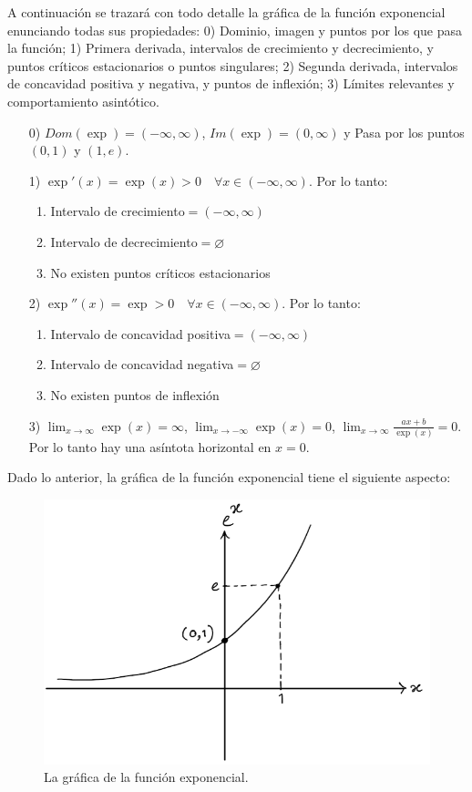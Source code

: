 \documentclass{article}
\numberwithin{equation}{section}
\begin{document}
A continuación se trazará con todo detalle la gráfica de la función exponencial enunciando todas sus propiedades: 0) Dominio, imagen y puntos por los que pasa la función; 1) Primera derivada, intervalos de crecimiento y decrecimiento, y puntos críticos estacionarios o puntos singulares; 2) Segunda derivada, intervalos de concavidad positiva y negativa, y puntos de inflexión; 3) Límites relevantes y comportamiento asintótico. 

\begin{enumerate}
    \item[0)] $Dom(\exp)=(-\infty,\infty)$, $Im(\exp)=(0,\infty)$ y Pasa por los puntos $(0,1)$ y $(1,e)$.
    \item[1)] $\exp'(x)=\exp(x)>0 \quad \forall x\in (-\infty,\infty)$. Por lo tanto:
    \begin{enumerate}
    \item Intervalo de crecimiento$=(-\infty,\infty)$
    \item Intervalo de decrecimiento$=\varnothing$
    \item No existen puntos críticos estacionarios
    \end{enumerate} 
    \item[2)] $\exp''(x)=\exp>0 \quad \forall x\in (-\infty,\infty)$. Por lo tanto:
    \begin{enumerate}
    \item Intervalo de concavidad positiva$=(-\infty,\infty)$
    \item Intervalo de concavidad negativa$=\varnothing$
    \item No existen puntos de inflexión
    \end{enumerate}
    \item[3)] $\lim_{x\to\infty}\exp(x)=\infty$, $\lim_{x\to -\infty}\exp(x)=0$, $\lim_{x\to\infty}\frac{ax+b}{\exp(x)}=0$. Por lo tanto hay una asíntota horizontal en $x=0$.
\end{enumerate}

Dado lo anterior, la gráfica de la función exponencial tiene el siguiente aspecto:

\begin{figure}[H]
    \centering
    \includegraphics[scale=0.4]{images/fig13.png}
    \caption{La gráfica de la función exponencial.}
    \label{fig:fig13}
\end{figure}
\end{document}
